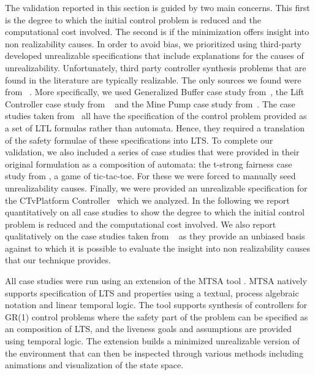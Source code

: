 The validation reported in this section is guided by two main concerns.  This first is the degree to which the initial control problem is reduced and the computational cost involved. The second is if the minimization offers insight into non realizability causes.
In order to avoid bias, we prioritized using third-party developed unrealizable specifications that include explanations for the causes of unrealizability.
Unfortunately, third party controller synthesis problems that are found in the literature are typically realizable. The only sources we found were from ~\cite{DBLP:conf/hvc/KonighoferHB10,DBLP:conf/kbse/DegiovanniRACA16,DBLP:conf/fmcad/AlurMT13}. More specifically, we used Generalized Buffer case study from~\cite{DBLP:conf/hvc/KonighoferHB10}, the Lift Controller case study from ~\cite{DBLP:conf/fmcad/AlurMT13} and the Mine Pump case study from~\cite{DBLP:conf/kbse/DegiovanniRACA16}.
The case studies taken from~\cite{DBLP:conf/hvc/KonighoferHB10,DBLP:conf/kbse/DegiovanniRACA16,DBLP:conf/fmcad/AlurMT13} all have  the specification of the control problem  provided as a set of LTL formulas rather than automata. Hence, they required a translation of the safety formulae of these specifications into LTS. To complete our validation, we also included a series of case studies that were provided in their original formulation as a composition of automata: the t-strong fairness case study from \cite{DBLP:conf/icse/DIppolitoBPU11}, a game of tic-tac-toe. For these we were forced to manually seed unrealizability causes. Finally, we were provided an unrealizable specification for the CTvPlatform Controller~\cite{DBLP:journals/computer/OmmeringLKM00} which we analyzed. 
In the following we report quantitatively on all case studies to show the degree to which the initial control problem is reduced and the computational cost involved. We also report qualitatively on the case studies taken from ~\cite{DBLP:conf/hvc/KonighoferHB10,DBLP:conf/kbse/DegiovanniRACA16,DBLP:conf/fmcad/AlurMT13} as they provide an unbiased basis against to which it is possible to evaluate the insight into non realizability causes that our technique provides. 


All case studies were run using an extension of the MTSA tool \cite{DBLP:conf/kbse/DIppolitoFCU08}. MTSA natively supports specification of LTS \cite{DBLP:journals/cacm/Keller76} and properties using
 a textual, process algebraic notation and linear temporal logic.  The tool supports synthesis of controllers for GR(1) control problems where the safety part of the problem can be specified as an composition of LTS, and the liveness goals and assumptions are provided using temporal logic.   
  The extension builds a minimized unrealizable version of the environment that can then be inspected through various methods including animations and visualization of the state space.
  
